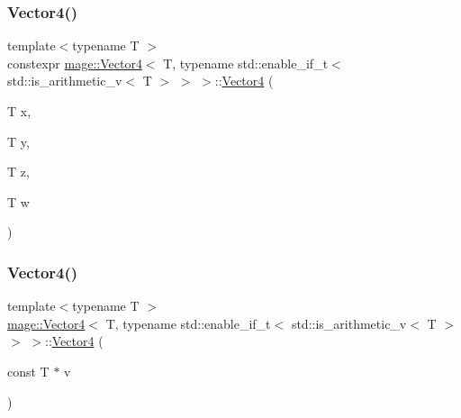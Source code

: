 \subsubsection{\texorpdfstring{Vector4()}{Vector4()}\hspace{0.1cm}{\footnotesize\ttfamily [2/8]}}
{\footnotesize\ttfamily template$<$typename T $>$ \\
constexpr \hyperlink{structmage_1_1_vector4}{mage\+::\+Vector4}$<$ T, typename std\+::enable\+\_\+if\+\_\+t$<$ std\+::is\+\_\+arithmetic\+\_\+v$<$ T $>$ $>$ $>$\+::\hyperlink{structmage_1_1_vector4}{Vector4} (\begin{DoxyParamCaption}\item[{T}]{x,  }\item[{T}]{y,  }\item[{T}]{z,  }\item[{T}]{w }\end{DoxyParamCaption})\hspace{0.3cm}{\ttfamily [noexcept]}}

\hypertarget{structmage_1_1_vector4_3_01_t_00_01typename_01std_1_1enable__if__t_3_01std_1_1is__arithmetic__v_3_01_t_01_4_01_4_01_4_a2b6bb42ebaa5ace70bcea453155dda28}{}\label{structmage_1_1_vector4_3_01_t_00_01typename_01std_1_1enable__if__t_3_01std_1_1is__arithmetic__v_3_01_t_01_4_01_4_01_4_a2b6bb42ebaa5ace70bcea453155dda28} 
\subsubsection{\texorpdfstring{Vector4()}{Vector4()}\hspace{0.1cm}{\footnotesize\ttfamily [3/8]}}
{\footnotesize\ttfamily template$<$typename T $>$ \\
\hyperlink{structmage_1_1_vector4}{mage\+::\+Vector4}$<$ T, typename std\+::enable\+\_\+if\+\_\+t$<$ std\+::is\+\_\+arithmetic\+\_\+v$<$ T $>$ $>$ $>$\+::\hyperlink{structmage_1_1_vector4}{Vector4} (\begin{DoxyParamCaption}\item[{const T $\ast$}]{v }\end{DoxyParamCaption})\hspace{0.3cm}{\ttfamily [noexcept]}}

